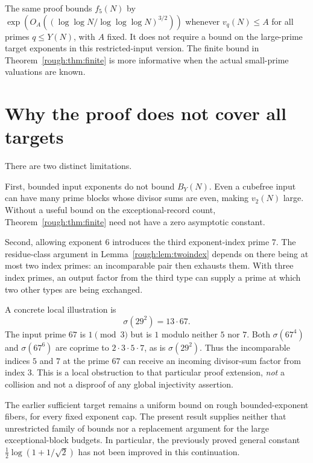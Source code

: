 \begin{remark}
The same proof bounds $f_5(N)$ by
$\exp(O_A((\log\log N/\log\log\log N)^{3/2}))$
whenever $v_q(N)\le A$ for all primes $q\le Y(N)$, with $A$ fixed. It does not require a bound on the large-prime target exponents in this restricted-input version. The finite bound in Theorem~\ref{rough:thm:finite} is more informative when the actual small-prime valuations are known.
\end{remark}


\section{Why the proof does not cover all targets}
There are two distinct limitations.

First, bounded input exponents do not bound $B_Y(N)$. Even a cubefree input can have many prime blocks whose divisor sums are even, making $v_2(N)$ large. Without a useful bound on the exceptional-record count, Theorem~\ref{rough:thm:finite} need not have a zero asymptotic constant.

Second, allowing exponent $6$ introduces the third exponent-index prime $7$. The residue-class argument in Lemma~\ref{rough:lem:twoindex} depends on there being at most two index primes: an incomparable pair then exhausts them. With three index primes, an output factor from the third type can supply a prime at which two other types are being exchanged.

A concrete local illustration is
\[
 \sigma(29^2)=13\cdot67.
\]
The input prime $67$ is $1\pmod3$ but is $1$ modulo neither $5$ nor $7$. Both $\sigma(67^4)$ and $\sigma(67^6)$ are coprime to $2\cdot3\cdot5\cdot7$, as is $\sigma(29^2)$. Thus the incomparable indices $5$ and $7$ at the prime $67$ can receive an incoming divisor-sum factor from index $3$. This is a local obstruction to that particular proof extension, \emph{not} a collision and not a disproof of any global injectivity assertion.

The earlier sufficient target remains a uniform bound on rough bounded-exponent fibers, for every fixed exponent cap. The present result supplies neither that unrestricted family of bounds nor a replacement argument for the large exceptional-block budgets. In particular, the previously proved general constant $\tfrac12\log(1+1/\sqrt2)$ has not been improved in this continuation.


